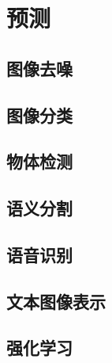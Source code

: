 \chapter{预测}

\section{图像去噪}

\section{图像分类}

\section{物体检测}

\section{语义分割}

\section{语音识别}

\section{文本图像表示}

\section{强化学习}